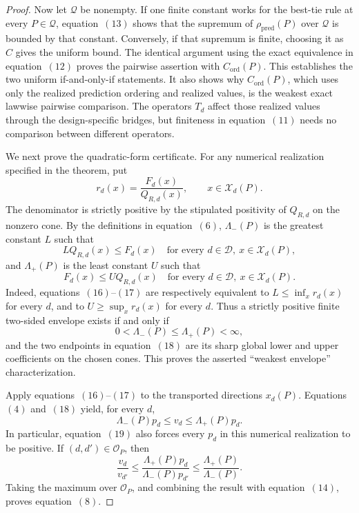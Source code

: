 \documentclass{article}
\begin{document}
\begin{proof}
Now let \(\mathcal Q\) be nonempty.  If one finite constant works for the best-tie rule at every \(P\in\mathcal Q\), equation~\((13)\) shows that the supremum of \(\rho_{\mathrm{pred}}(P)\) over \(\mathcal Q\) is bounded by that constant.  Conversely, if that supremum is finite, choosing it as \(C\) gives the uniform bound.  The identical argument using the exact equivalence in equation~\((12)\) proves the pairwise assertion with \(C_{\mathrm{ord}}(P)\).  This establishes the two uniform if-and-only-if statements.  It also shows why \(C_{\mathrm{ord}}(P)\), which uses only the realized prediction ordering and realized values, is the weakest exact lawwise pairwise comparison.  The operators \(T_d\) affect those realized values through the design-specific bridges, but finiteness in equation~\((11)\) needs no comparison between different operators.

We next prove the quadratic-form certificate.  For any numerical realization specified in the theorem, put
\[
 r_d(x)=\frac{F_d(x)}{Q_{R,d}(x)},
 \qquad x\in\mathcal X_d(P).                              \tag{15}
\]
The denominator is strictly positive by the stipulated positivity of \(Q_{R,d}\) on the nonzero cone.  By the definitions in equation~\((6)\), \(\Lambda_-(P)\) is the greatest constant \(L\) such that
\[
 LQ_{R,d}(x)\le F_d(x)
 \quad\text{for every }d\in\mathcal D,
 \ x\in\mathcal X_d(P),                                  \tag{16}
\]
and \(\Lambda_+(P)\) is the least constant \(U\) such that
\[
 F_d(x)\le UQ_{R,d}(x)
 \quad\text{for every }d\in\mathcal D,
 \ x\in\mathcal X_d(P).                                  \tag{17}
\]
Indeed, equations~\((16)\)--\((17)\) are respectively equivalent to \(L\le\inf_xr_d(x)\) for every \(d\), and to \(U\ge\sup_xr_d(x)\) for every \(d\).  Thus a strictly positive finite two-sided envelope exists if and only if
\[
 0<\Lambda_-(P)\le\Lambda_+(P)<\infty,                   \tag{18}
\]
and the two endpoints in equation~\((18)\) are its sharp global lower and upper coefficients on the chosen cones.  This proves the asserted ``weakest envelope'' characterization.

Apply equations~\((16)\)--\((17)\) to the transported directions \(x_d(P)\).  Equations~\((4)\) and~\((18)\) yield, for every \(d\),
\[
 \Lambda_-(P)p_d\le v_d\le\Lambda_+(P)p_d.               \tag{19}
\]
In particular, equation~\((19)\) also forces every \(p_d\) in this numerical realization to be positive.  If \((d,d')\in\mathcal O_P\), then
\[
 \frac{v_d}{v_{d'}}
 \le
 \frac{\Lambda_+(P)p_d}{\Lambda_-(P)p_{d'}}
 \le \frac{\Lambda_+(P)}{\Lambda_-(P)}.                  \tag{20}
\]
Taking the maximum over \(\mathcal O_P\), and combining the result with equation~\((14)\), proves equation~\((8)\).


\end{proof}
\end{document}
